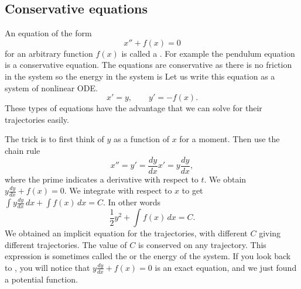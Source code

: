 \documentclass[12pt]{book}
\begin{document}
\subsection{Conservative equations}

An equation of the form
\begin{equation*}
x'' + f(x) = 0
\end{equation*}
for an arbitrary function $f(x)$ is called a
\emph{}.  For example the pendulum equation
is a conservative equation.  The equations are conservative as there is no
friction in the system so the energy in the system is 
Let us write this equation as a
system of nonlinear ODE.
\begin{equation*}
x' = y, \qquad y' = -f(x) .
\end{equation*}
These types of equations have the
advantage that we can solve for their trajectories easily.

The trick is to first think of $y$ as a function of $x$ for a moment.  Then
use the chain rule
\begin{equation*}
x'' = y' = \frac{dy}{dx} x' = y \frac{dy}{dx} ,
\end{equation*}
where the prime indicates a derivative with respect to $t$.  
We obtain $y \frac{dy}{dx} + f(x) = 0$.  We integrate with respect to
$x$ to get
$\int y \frac{dy}{dx} \,dx + \int f(x)\, dx = C$.  In other words
\begin{equation*}
\frac{1}{2} y^2  + \int f(x)\, dx = C .
\end{equation*}
We obtained an implicit equation for the trajectories, with different $C$
giving different trajectories.  The value of
$C$ is conserved on any trajectory.  This expression is
sometimes called the \emph{} or the energy of the
system.
If you look back to , you will notice
that $y\frac{dy}{dx} + f(x) = 0$ is an exact equation, and
we just found a potential function.
\end{document}
